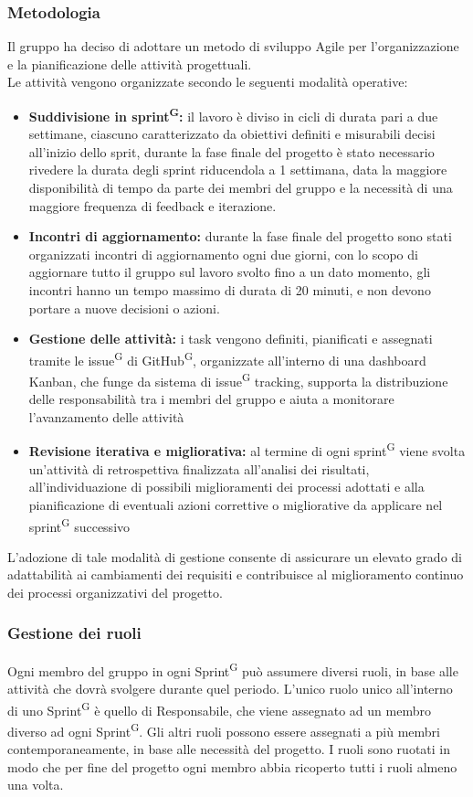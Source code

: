 \documentclass[a4paper, 11pt]{article}
\begin{document}
\subsubsection{Metodologia}
Il gruppo ha deciso di adottare un metodo di sviluppo Agile per l'organizzazione e la pianificazione delle attività progettuali.\\
Le attività vengono organizzate secondo le seguenti modalità operative:
\begin{itemize}
    \item \textbf{Suddivisione in sprint\textsuperscript{G}:} il lavoro è diviso in cicli di durata pari a due settimane, ciascuno caratterizzato da obiettivi definiti e misurabili decisi all'inizio dello sprit, durante la fase finale del progetto è stato necessario rivedere la durata degli sprint riducendola a 1 settimana, data la maggiore disponibilità di tempo da parte dei membri del gruppo e la necessità di una maggiore frequenza di feedback e iterazione.
    \item \textbf{Incontri di aggiornamento:} durante la fase finale del progetto sono stati organizzati incontri di aggiornamento ogni due giorni, con lo scopo di aggiornare tutto il gruppo sul lavoro svolto fino a un dato momento, gli incontri hanno un tempo massimo di durata di 20 minuti, e non devono portare a nuove decisioni o azioni.
    \item \textbf{Gestione delle attività:} i task vengono definiti, pianificati e assegnati tramite le issue\textsuperscript{G} di GitHub\textsuperscript{G}, organizzate all'interno di una dashboard Kanban, che funge da sistema di issue\textsuperscript{G} tracking, supporta la distribuzione delle responsabilità tra i membri del gruppo e aiuta a monitorare l'avanzamento delle attività
    \item \textbf{Revisione iterativa e migliorativa:} al termine di ogni sprint\textsuperscript{G} viene svolta un'attività di retrospettiva finalizzata all'analisi dei risultati, all'individuazione di possibili miglioramenti dei processi adottati e alla pianificazione di eventuali azioni correttive o migliorative da applicare nel sprint\textsuperscript{G} successivo
\end{itemize}
L'adozione di tale modalità di gestione consente di assicurare un elevato grado di adattabilità ai cambiamenti dei requisiti e contribuisce al miglioramento continuo dei processi organizzativi del progetto.
\subsubsection{Gestione dei ruoli} 
Ogni membro del gruppo in ogni Sprint\textsuperscript{G} può assumere diversi ruoli, in base alle attività che dovrà svolgere durante quel periodo. 
L'unico ruolo unico all'interno di uno Sprint\textsuperscript{G} è quello di Responsabile, che viene assegnato ad un membro diverso ad ogni Sprint\textsuperscript{G}.
Gli altri ruoli possono essere assegnati a più membri contemporaneamente, in base alle necessità del progetto.
I ruoli sono ruotati in modo che per fine del progetto ogni membro abbia ricoperto tutti i ruoli almeno una volta.
\end{document}
